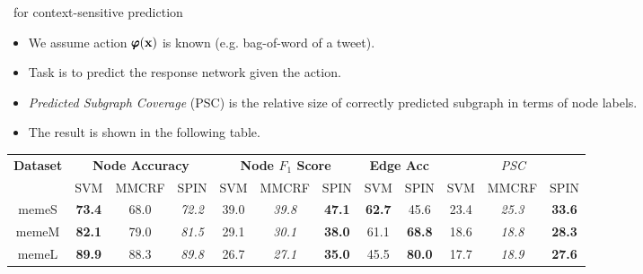 \documentclass[first=dgreen,second=purple,logo=yellowexc]{aaltoslides}
\begin{document}
\begin{frame}{\spin\ for context-sensitive prediction}
	\begin{itemize}\footnotesize
		\item We assume action $\pmb \varphi(\mathbf {x})$ is known (e.g. bag-of-word of a tweet).
		\item Task is to predict the response network given the action.
		\item {\em Predicted Subgraph Coverage} (PSC) is the relative size of correctly predicted subgraph in terms of node labels.
		\item The result is shown in the following table.
	\end{itemize}	
		\begin{table}[t]
		\scriptsize
		\centering
		\begin{tabular}{|@{  }c@{  }|@{}c@{  }c@{  }c@{}|@{}c@{  }c@{  }c@{}|@{}c@{ }c@{}|@{}c@{  }c@{  }c@{}|}
		  \hline
		\multirow{2}{*}{\textbf{Dataset}} & \multicolumn{3}{c}{\textbf{Node Accuracy}} & \multicolumn{3}{|c}{\textbf{Node $F_1$ Score}} & \multicolumn{2}{|c}{\textbf{Edge Acc}} & \multicolumn{3}{|c|}{{\em PSC}}  \\ \cline{2-12}
		 & \scriptsize{SVM} & \scriptsize{MMCRF} & \scriptsize{SPIN} & \scriptsize{SVM} & \scriptsize{MMCRF} & \scriptsize{SPIN} & \scriptsize{SVM}  & \scriptsize{SPIN}  & \scriptsize{SVM} & \scriptsize{MMCRF} & \scriptsize{SPIN}  \\ \hline
		   memeS  & \textbf{73.4} & {68.0} & \em{72.2} & {39.0} & \em{39.8} & \textbf{47.1} & \textbf{62.7} & {45.6} & {23.4} & \em{25.3} & \textbf{33.6} \\ 
		   memeM  & \textbf{82.1} & {79.0} & \em{81.5} & {29.1} & \em{30.1} & \textbf{38.0} & {61.1} & \textbf{68.8} & {18.6} & \em{18.8} & \textbf{28.3} \\ 
		   memeL  & \textbf{89.9} & {88.3} & \em{89.8} & {26.7} & \em{27.1} & \textbf{35.0} & {45.5} & \textbf{80.0} & {17.7} & \em{18.9} & \textbf{27.6} \\ 

\end{tabular}
\end{table}
\end{frame}
\end{document}
